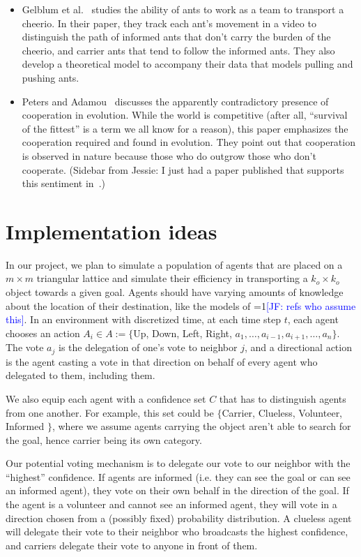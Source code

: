 \documentclass[12pt]{article}
\newcommand{\Comments}{1}
\newcommand{\mynote}[2]{\ifnum\Comments=1\textcolor{#1}{#2}\fi}
\newcommand{\jessie}[1]{\mynote{blue}{[JF: #1]}}
\begin{document}
\begin{itemize}
	\item Gelblum et al.~\cite{gelblum2015ant} studies the ability of ants to work as a team to transport a cheerio.
	In their paper, they track each ant's movement in a video to distinguish the path of informed ants that don't carry the burden of the cheerio, and carrier ants that tend to follow the informed ants.
	They also develop a theoretical model to accompany their data that models pulling and pushing ants.
	\item Peters and Adamou~\cite{peters2015evolutionary} discusses the apparently contradictory presence of cooperation in evolution.
	While the world is competitive (after all, ``survival of the fittest'' is a term we all know for a reason), this paper emphasizes the cooperation required and found in evolution.
	They point out that cooperation is observed in nature because those who do outgrow those who don't cooperate.
	(Sidebar from Jessie: I just had a paper published that supports this sentiment in~\cite{finocchiaro2019evolving}.)
	
\end{itemize}

\section{Implementation ideas}
In our project, we plan to simulate a population of agents that are placed on a $m \times m$ triangular lattice and simulate their efficiency in transporting a $k_o \times k_o$ object towards a given goal.
Agents should have varying amounts of knowledge about the location of their destination, like the models of \jessie{refs who assume this}.
In an environment with discretized time, at each time step $t$, each agent chooses an action $A_i \in A := \{$Up, Down, Left, Right, $a_1, \ldots, a_{i-1}, a_{i+1}, \ldots, a_n \}$.
The vote $a_j$ is the delegation of one's vote to neighbor $j$, and a directional action is the agent casting a vote in that direction on behalf of every agent who delegated to them, including them.

We also equip each agent with a confidence set $C$ that has to distinguish agents from one another.
For example, this set could be $\{$Carrier, Clueless, Volunteer, Informed $\}$, where we assume agents carrying the object aren't able to search for the goal, hence carrier being its own category.

Our potential voting mechanism is to delegate our vote to our neighbor with the ``highest'' confidence.
If agents are informed (i.e. they can see the goal or can see an informed agent), they vote on their own behalf in the direction of the goal.
If the agent is a volunteer and cannot see an informed agent, they will vote in a direction chosen from a (possibly  fixed) probability distribution.
A clueless agent will delegate their vote to their neighbor who broadcasts the highest confidence, and carriers delegate their vote to anyone in front of them.
\end{document}
